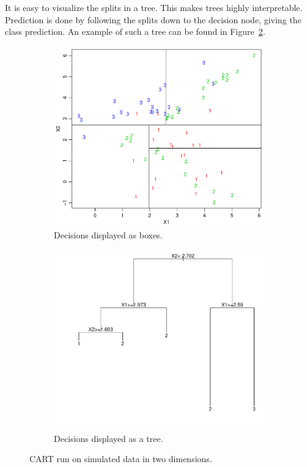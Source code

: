 It is easy to visualize the splits in a tree. This makes trees highly interpretable. Prediction is done by following the splits down to the decision node, giving the class prediction. An example of such a tree can be found in Figure~\ref{fig:cartTree1}.
\\
\begin{figure}[htbp]
  \centering
  \begin{subfigure}[b]{0.48\textwidth}
    \includegraphics[width=\textwidth]{./figures/cartAreas1.pdf}
    \caption{Decisions displayed as boxes.}
    \label{fig:cartAreas1}
  \end{subfigure}%
  \quad
  \begin{subfigure}[b]{0.48\textwidth}
    \includegraphics[width=\textwidth]{./figures/cartTree1.pdf}
    \caption{Decisions displayed as a tree.}
    \label{fig:cartTree1}
  \end{subfigure}
  \vspace{1\baselineskip}
  \caption{CART run on simulated data in two dimensions. }
  \label{fig:cart}
\end{figure}
